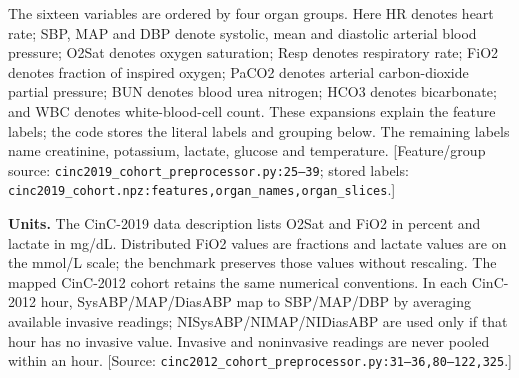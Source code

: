 The sixteen variables are ordered by four organ groups. Here HR denotes heart rate; SBP, MAP and DBP denote systolic, mean and diastolic arterial blood pressure; O2Sat denotes oxygen saturation; Resp denotes respiratory rate; FiO2 denotes fraction of inspired oxygen; PaCO2 denotes arterial carbon-dioxide partial pressure; BUN denotes blood urea nitrogen; HCO3 denotes bicarbonate; and WBC denotes white-blood-cell count. These expansions explain the feature labels; the code stores the literal labels and grouping below. The remaining labels name creatinine, potassium, lactate, glucose and temperature. [Feature/group source: \texttt{cinc2019\_\allowbreak{}cohort\_\allowbreak{}preprocessor.\allowbreak{}py:\allowbreak{}25–\allowbreak{}39}; stored labels: \texttt{cinc2019\_\allowbreak{}cohort.\allowbreak{}npz:\allowbreak{}features,\allowbreak{}organ\_\allowbreak{}names,\allowbreak{}organ\_\allowbreak{}slices}.]

\noindent\textbf{Units.} The CinC-2019 data description lists O2Sat and FiO2 in percent and lactate in mg/dL. Distributed FiO2 values are fractions and lactate values are on the mmol/L scale; the benchmark preserves those values without rescaling. The mapped CinC-2012 cohort retains the same numerical conventions. In each CinC-2012 hour, SysABP/MAP/DiasABP map to SBP/MAP/DBP by averaging available invasive readings; NISysABP/NIMAP/NIDiasABP are used only if that hour has no invasive value. Invasive and noninvasive readings are never pooled within an hour. [Source: \texttt{cinc2012\_cohort\_preprocessor.py:31--36,80--122,325}.]



